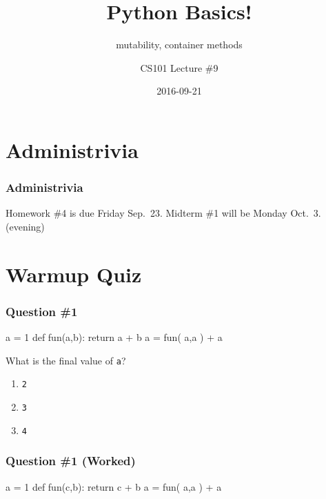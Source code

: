 \documentclass[11pt]{beamer}
\title{Python Basics!}
\subtitle{mutability, container methods}
\author{CS101 Lecture \#9}
\date{2016-09-21}
\begin{document}
  \setcounter{showProgressBar}{0}
  \setcounter{showSlideNumbers}{0}

\frame{\titlepage}

\setcounter{framenumber}{0}
\setcounter{showProgressBar}{1}
\setcounter{showSlideNumbers}{1}

\section{Administrivia}

\begin{frame}
  \frametitle{Administrivia}
  \Enlarge
  \begin{itemize}
  \myitem  Homework \#4 is due Friday Sep.\ 23.
  \myitem  Midterm \#1 will be Monday Oct.\ 3.  (evening)
  \end{itemize}
\end{frame}

\section{Warmup Quiz}

\begin{frame}[fragile]
  \frametitle{Question \#1}
  \Enlarge

  \begin{semiverbatim}
a = 1
def fun(a,b):
    return a + b
a = fun( a,a ) + a
  \end{semiverbatim}
  What is the final value of \texttt{a}?
  \begin{enumerate}[label=\Alph*]
  \item  \texttt{2}
  \item  \texttt{3}
  \item  \texttt{4}
  \end{enumerate}
\end{frame}

\begin{frame}[fragile]
  \frametitle{Question \#1 (Worked)}
  \Enlarge

  \begin{semiverbatim}
a = 1
def fun(c,b):
    return c + b
a = fun( a,a ) + a
  \end{semiverbatim}
\end{frame}
\end{document}
